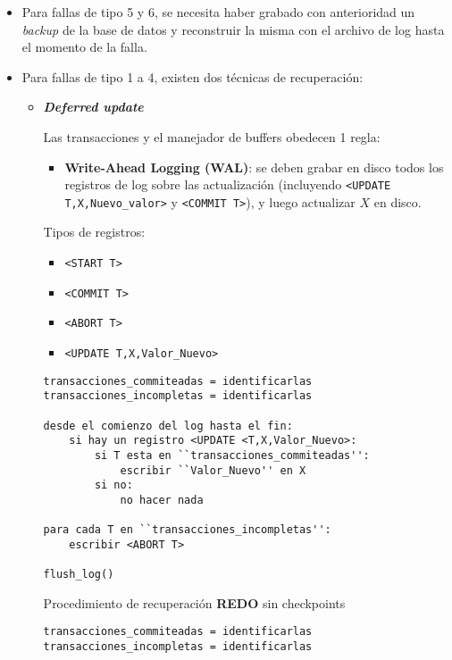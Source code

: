 \documentclass[a4paper, twoside]{article}
\begin{document}
\begin{itemize}
	\item Para fallas de tipo 5 y 6, se necesita haber grabado con anterioridad un \emph{backup} de la base de datos y reconstruir la misma con el archivo de log hasta el momento de la falla.
	\item Para fallas de tipo 1 a 4, existen dos técnicas de recuperación:
		\begin{itemize}
			\item \textbf{\emph{Deferred update}}

			Las transacciones y el manejador de buffers obedecen 1 regla:
			\begin{itemize}
				\item \textbf{Write-Ahead Logging (WAL)}: se deben grabar en disco todos los registros de log sobre las actualización (incluyendo \texttt{<UPDATE T,X,Nuevo\_valor>} y \texttt{<COMMIT T>}), y luego actualizar $X$ en disco.
			\end{itemize}

			Tipos de registros:
			\begin{itemize}
				\item \texttt{<START T>}
				\item \texttt{<COMMIT T>}
				\item \texttt{<ABORT T>}
				\item \texttt{<UPDATE T,X,Valor\_Nuevo>}
			\end{itemize}

			\begin{algorithm}[H]
				\begin{lstlisting}
transacciones_commiteadas = identificarlas
transacciones_incompletas = identificarlas

desde el comienzo del log hasta el fin:
	si hay un registro <UPDATE <T,X,Valor_Nuevo>:
		si T esta en ``transacciones_commiteadas'':
			escribir ``Valor_Nuevo'' en X
		si no:
			no hacer nada

para cada T en ``transacciones_incompletas'':
	escribir <ABORT T>

flush_log()
				\end{lstlisting}
				\caption{Procedimiento de recuperación \textbf{REDO }sin checkpoints}
			\end{algorithm}

			\begin{algorithm}[H]
				\begin{lstlisting}
transacciones_commiteadas = identificarlas
transacciones_incompletas = identificarlas


\end{lstlisting}
\end{algorithm}
\end{itemize}
\end{itemize}
\end{document}
